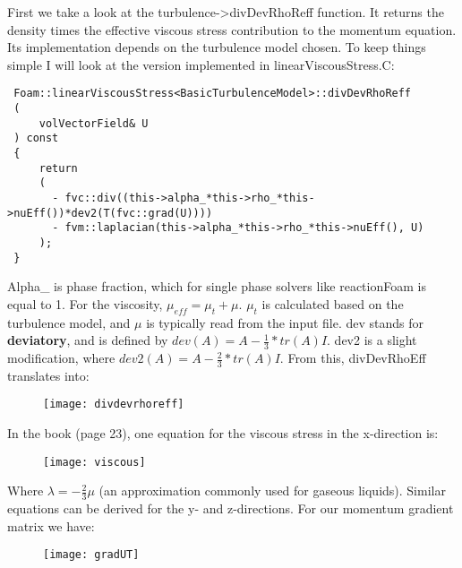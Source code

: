 \vspace{\baselineskip}
First we take a look at the turbulence->divDevRhoReff function. It returns the density times the effective viscous stress contribution to the momentum equation. Its implementation depends on the turbulence model chosen. To keep things simple I will look at the version implemented in linearViscousStress.C:
\vspace{\baselineskip}
\begin{verbatim}
 Foam::linearViscousStress<BasicTurbulenceModel>::divDevRhoReff
 (
     volVectorField& U
 ) const
 {
     return
     (
       - fvc::div((this->alpha_*this->rho_*this->nuEff())*dev2(T(fvc::grad(U))))
       - fvm::laplacian(this->alpha_*this->rho_*this->nuEff(), U)
     );
 }
\end{verbatim}
Alpha\_ is phase fraction, which for single phase solvers like reactionFoam is equal to 1.
\vspace{\baselineskip}
For the viscosity, $\mu_{eff} = \mu_t + \mu$. $\mu_t$ is calculated based on the turbulence model, and $\mu$ is typically read from the input file.
\vspace{\baselineskip}
dev stands for \textbf{deviatory}, and is defined by $dev(A) = A - \frac{1}{3}*tr(A)I$. dev2 is a slight modification, where $dev2(A) = A - \frac{2}{3}*tr(A)I$.
\vspace{\baselineskip}
From this, divDevRhoEff translates into:

\begin{figure}[H]
\centering
\texttt{[image: divdevrhoreff]}
\end{figure}

In the book (page 23), one equation for the viscous stress in the x-direction is:

\begin{figure}[H]
\centering
\texttt{[image: viscous]}
\end{figure}

Where $\lambda = -\frac{2}{3}\mu$ (an approximation commonly used for gaseous liquids). Similar equations can be derived for the y- and z-directions.
\vspace{\baselineskip}
For our momentum gradient matrix we have:
\begin{figure}[H]
\centering
\texttt{[image: gradUT]}
\end{figure}

